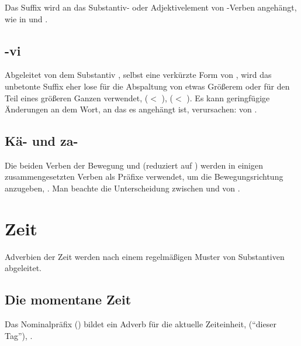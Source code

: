 \subsubsection{} Das Suffix  wird an das Substantiv- oder Adjektivelement von -Verben angehängt, wie in   und  .

\subsection{-vi} Abgeleitet von dem Substantiv , selbst eine verkürzte Form von  , wird das unbetonte Suffix  eher lose für die Abspaltung von etwas Größerem oder für den Teil eines größeren Ganzen verwendet,   ($<$  ),   ($<$  ). Es kann geringfügige Änderungen an dem Wort, an das es angehängt ist, verursachen:   von  .

\subsection{Kä- und za-} Die beiden Verben der Bewegung   und   (reduziert auf ) werden in einigen zusammengesetzten Verben als Präfixe verwendet, um die Bewegungsrichtung anzugeben,  . Man beachte die Unterscheidung zwischen   und   von  .

\section{Zeit}
\noindent Adverbien der Zeit werden nach einem regelmäßigen Muster von Substantiven abgeleitet.

\subsection{Die momentane Zeit} Das Nominalpräfix  () bildet ein Adverb für die aktuelle Zeiteinheit,   (``dieser Tag''),  . 

